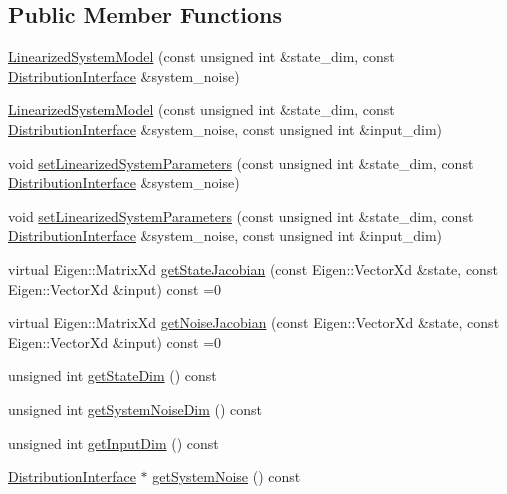 \subsection*{Public Member Functions}
\begin{DoxyCompactItemize}
\item 
\hyperlink{classrefill_1_1LinearizedSystemModel_acc912853987bb55770157dcbb6236c2c}{Linearized\+System\+Model} (const unsigned int \&state\+\_\+dim, const \hyperlink{classrefill_1_1DistributionInterface}{Distribution\+Interface} \&system\+\_\+noise)
\item 
\hyperlink{classrefill_1_1LinearizedSystemModel_a00ed6658467af5ae4f18a53ef0b3f637}{Linearized\+System\+Model} (const unsigned int \&state\+\_\+dim, const \hyperlink{classrefill_1_1DistributionInterface}{Distribution\+Interface} \&system\+\_\+noise, const unsigned int \&input\+\_\+dim)
\item 
void \hyperlink{classrefill_1_1LinearizedSystemModel_a84bb46abc9259196ed37134c42aca1de}{set\+Linearized\+System\+Parameters} (const unsigned int \&state\+\_\+dim, const \hyperlink{classrefill_1_1DistributionInterface}{Distribution\+Interface} \&system\+\_\+noise)
\item 
void \hyperlink{classrefill_1_1LinearizedSystemModel_afe44451082fcc71935262960fa9a817d}{set\+Linearized\+System\+Parameters} (const unsigned int \&state\+\_\+dim, const \hyperlink{classrefill_1_1DistributionInterface}{Distribution\+Interface} \&system\+\_\+noise, const unsigned int \&input\+\_\+dim)
\item 
virtual Eigen\+::\+Matrix\+Xd \hyperlink{classrefill_1_1LinearizedSystemModel_a4a0bd58431d96f37cf52494fcbcd2d07}{get\+State\+Jacobian} (const Eigen\+::\+Vector\+Xd \&state, const Eigen\+::\+Vector\+Xd \&input) const =0
\item 
virtual Eigen\+::\+Matrix\+Xd \hyperlink{classrefill_1_1LinearizedSystemModel_a2fdc435d8e47f27ad167ff31827a1c48}{get\+Noise\+Jacobian} (const Eigen\+::\+Vector\+Xd \&state, const Eigen\+::\+Vector\+Xd \&input) const =0
\item 
unsigned int \hyperlink{classrefill_1_1LinearizedSystemModel_a9b7a4aa2b6405dacfb97504039ec8143}{get\+State\+Dim} () const 
\item 
unsigned int \hyperlink{classrefill_1_1LinearizedSystemModel_abf0567c21c8e5bbb2427a07a45c9e87c}{get\+System\+Noise\+Dim} () const 
\item 
unsigned int \hyperlink{classrefill_1_1LinearizedSystemModel_af93eb816f491145b875ddbc7660c76b0}{get\+Input\+Dim} () const 
\item 
\hyperlink{classrefill_1_1DistributionInterface}{Distribution\+Interface} $\ast$ \hyperlink{classrefill_1_1LinearizedSystemModel_a4d77bbe4bd353226b107548bb93c9c58}{get\+System\+Noise} () const 
\end{DoxyCompactItemize}
